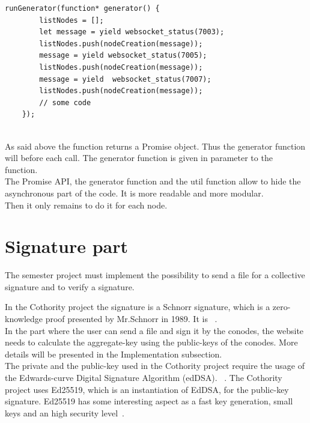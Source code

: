 \documentclass[11pt, a4paper, twoside, openright, openany]{book} %
\begin{document}
\begin{lstlisting}[caption={Extract from the project's code reaching conodes at port 7003, 7005 and 7007}, captionpos=b]
  runGenerator(function* generator() {
        listNodes = [];
        let message = yield websocket_status(7003);
        listNodes.push(nodeCreation(message));
        message = yield websocket_status(7005);
        listNodes.push(nodeCreation(message));
        message = yield  websocket_status(7007);
        listNodes.push(nodeCreation(message));
        // some code
    });
\end{lstlisting}
\leavevmode \\
As said above the  function returns a Promise object. Thus
the generator function  will  before each  call.
The generator function is given in parameter to the  function.\\
The Promise API, the generator function and the util function  allow to hide
the asynchronous part of the code. It is more readable and more modular.\\


Then it only remains to do it for each node.

\section{Signature part}
The semester project must implement the possibility to send a file for a collective signature
and to verify a signature.


In the Cothority project the signature is a Schnorr signature, which is a zero-knowledge proof presented
by Mr.Schnorr in 1989. It is ~\cite{wikiSchnorr}.\\
In the part where the user can send a file and sign it by the conodes,
the website needs to calculate the aggregate-key using the public-keys of the conodes.
More details will be presented in the Implementation subsection.\\
The private and the public-key used in the Cothority project require the usage of
the Edwards-curve Digital Signature Algorithm (edDSA).
~\cite{edDSA}.
The Cothority project uses Ed25519, which is an instantiation of EdDSA, for the
public-key signature. Ed25519 has some interesting aspect as a fast key generation,
small keys and an high security level~\cite{ed25519}.\\
\end{document}
